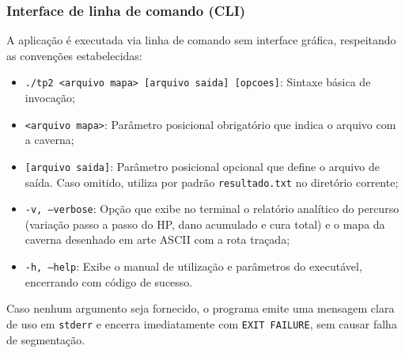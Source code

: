 \documentclass[12pt,a4paper]{article}
\makeatletter
\DeclareRobustCommand{\_}{%
  \ifmmode
    \nfss@text{\textunderscore}%
  \else
    \textunderscore\allowbreak
  \fi
}
\makeatother
\begin{document}
\subsubsection*{Interface de linha de comando (CLI)}

A aplicação é executada via linha de comando sem interface gráfica, respeitando as convenções estabelecidas:
\begin{itemize}
    \item \texttt{./tp2 <arquivo\_mapa> [arquivo\_saida] [opcoes]}: Sintaxe básica de invocação;
    \item \texttt{<arquivo\_mapa>}: Parâmetro posicional obrigatório que indica o arquivo com a caverna;
    \item \texttt{[arquivo\_saida]}: Parâmetro posicional opcional que define o arquivo de saída. Caso omitido, utiliza por padrão \texttt{resultado.txt} no diretório corrente;
    \item \texttt{-v, --verbose}: Opção que exibe no terminal o relatório analítico do percurso (variação passo a passo do HP, dano acumulado e cura total) e o mapa da caverna desenhado em arte ASCII com a rota traçada;
    \item \texttt{-h, --help}: Exibe o manual de utilização e parâmetros do executável, encerrando com código de sucesso.
\end{itemize}

Caso nenhum argumento seja fornecido, o programa emite uma mensagem clara de uso em \texttt{stderr} e encerra imediatamente com \texttt{EXIT\_FAILURE}, sem causar falha de segmentação.
\end{document}
